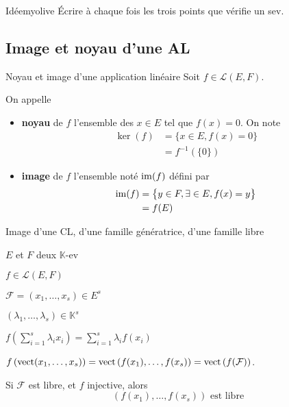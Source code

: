     \begin{demo}{Idée}{myolive}
        Écrire à chaque fois les trois points que vérifie un sev.
    \end{demo}

\subsection{Image et noyau d’une AL}

    \begin{defi}{Noyau et image d’une application linéaire}{}
        Soit $f \in \mathcal{L}(E,F)$.

        On appelle
        \begin{itemize}
            \item \textbf{noyau} de $f$ l’ensemble des $x \in E$ tel que $f(x) = 0$. On note 
            \begin{align*}
                \ker(f) &= \big\{ x \in E, f(x) = 0 \big\} \\
                &= f^{-1}\left(\{0\}\right)
            \end{align*}
            \item \textbf{image} de $f$ l’ensemble noté $\operatorname{im}(f)$ défini par 
            \begin{align*}
                \operatorname{im}(f) &= \big\{ y \in F, \exists \in E, f(x) = y \big\} \\
                &= f(E)
            \end{align*}
        \end{itemize}
    \end{defi}

    \begin{prop}{Image d’une CL, d’une famille génératrice, d’une famille libre}{}
        \begin{soient}
            \item $E$ et $F$ deux $\mathbb{K}$-ev
            \item $f \in \mathcal{L}(E,F)$
            \item $\mathcal{F} = (x_1, \ldots, x_s) \in E^s$
            \item $(\lambda_1, \ldots, \lambda_s) \in \mathbb{K}^s$
        \end{soient}
        \begin{alors}
            \item $f\left(\sum\limits_{i=1}^{s} \lambda_i x_i\right) = \sum\limits_{i=1}^{s} \lambda_i f(x_i)$
            \item $f \left( \operatorname{vect}(x_1, \ldots, x_s) \right) = \operatorname{vect} \left( f(x_1), \ldots, f(x_s) \right) = \operatorname{vect}\left(f(\mathcal{F})\right)$.
            \item Si $\mathcal{F}$ est libre, et $f$ injective, alors 
            \[ (f(x_1), \ldots, f(x_s)) \text{ est libre} \] 
        \end{alors}
    \end{prop}

